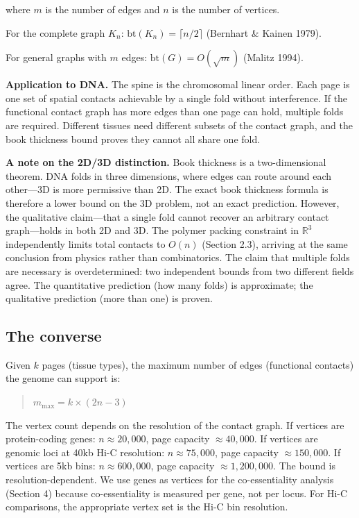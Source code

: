 \documentclass[11pt]{article}
\theoremstyle{definition}
\begin{document}
where $m$ is the number of edges and $n$ is the number of vertices.

For the complete graph $K_n$: $\mathrm{bt}(K_n) = \lceil n/2 \rceil$ (Bernhart \& Kainen 1979).

For general graphs with $m$ edges: $\mathrm{bt}(G) = O(\sqrt{m})$ (Malitz 1994).

\textbf{Application to DNA.} The spine is the chromosomal linear order. Each page is one set of spatial contacts achievable by a single fold without interference. If the functional contact graph has more edges than one page can hold, multiple folds are required. Different tissues need different subsets of the contact graph, and the book thickness bound proves they cannot all share one fold.

\textbf{A note on the 2D/3D distinction.} Book thickness is a two-dimensional theorem. DNA folds in three dimensions, where edges can route around each other---3D is more permissive than 2D. The exact book thickness formula is therefore a lower bound on the 3D problem, not an exact prediction. However, the qualitative claim---that a single fold cannot recover an arbitrary contact graph---holds in both 2D and 3D. The polymer packing constraint in $\mathbb{R}^3$ independently limits total contacts to $O(n)$ (Section 2.3), arriving at the same conclusion from physics rather than combinatorics. The claim that multiple folds are necessary is overdetermined: two independent bounds from two different fields agree. The quantitative prediction (how many folds) is approximate; the qualitative prediction (more than one) is proven.

\subsection{The converse}

Given $k$ pages (tissue types), the maximum number of edges (functional contacts) the genome can support is:

\begin{quote}
$m_{\max} = k \times (2n - 3)$
\end{quote}

The vertex count depends on the resolution of the contact graph. If vertices are protein-coding genes: $n \approx 20{,}000$, page capacity $\approx 40{,}000$. If vertices are genomic loci at 40kb Hi-C resolution: $n \approx 75{,}000$, page capacity $\approx 150{,}000$. If vertices are 5kb bins: $n \approx 600{,}000$, page capacity $\approx 1{,}200{,}000$. The bound is resolution-dependent. We use genes as vertices for the co-essentiality analysis (Section 4) because co-essentiality is measured per gene, not per locus. For Hi-C comparisons, the appropriate vertex set is the Hi-C bin resolution.
\end{document}

